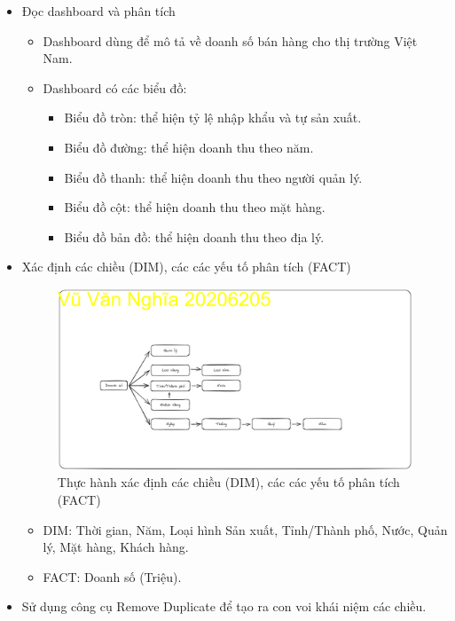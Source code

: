 \documentclass{article}
\begin{document}
\begin{itemize}
\item Đọc dashboard và phân tích
\begin{itemize}
\item Dashboard dùng để mô tả về doanh số bán hàng cho thị trường Việt Nam.
\item Dashboard có các biểu đồ:
\begin{itemize}
\item Biểu đồ tròn: thể hiện tỷ lệ nhập khẩu và tự sản xuất.
\item Biểu đồ đường: thể hiện doanh thu theo năm.
\item Biểu đồ thanh: thể hiện doanh thu theo người quản lý.
\item Biểu đồ cột: thể hiện doanh thu theo mặt hàng.
\item Biểu đồ bản đồ: thể hiện doanh thu theo địa lý.
\end{itemize}
\end{itemize}
\item Xác định các chiều (DIM), các các yếu tố phân tích (FACT)

\begin{figure}[H]
\centering
\includegraphics[scale = 0.15]{Bai1/ThucHanh/DIM-FACT.excalidraw.png}
\caption{Thực hành xác định các chiều (DIM), các các yếu tố phân tích (FACT)}
\end{figure}

\begin{itemize}
\item DIM: Thời gian, Năm, Loại hình Sản xuất, Tỉnh/Thành phố, Nước, Quản lý, Mặt hàng, Khách hàng.
\item FACT: Doanh số (Triệu).
\end{itemize}

\item Sử dụng công cụ Remove Duplicate để tạo ra con voi khái niệm các chiều.


\end{itemize}
\end{document}
